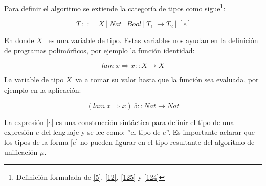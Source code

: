     \begin{definition}
        Para definir el algoritmo se extiende la categoría de tipos como sigue\footnote{Definición formulada de \hyperlink{5}{[5]},  \hyperlink{12}{[12]}, \hyperlink{125}{[125]} y \hyperlink{124}{[124]}}:
        
        $$\ T\ ::=\ X\ |\ Nat\ |\ Bool\ |\ T_1\ \to T_2\ |\ [e]$$
        
        En donde $X$ $\,$ es una variable de tipo. Estas variables nos ayudan en la definición de programas polimórficos, por ejemplo la función identidad:
        
        $$lam\ x\Rightarrow x :: X \to X$$ 
        
        La variable de tipo $X$$\,$ va a tomar su valor hasta que la función sea evaluada, por ejemplo en la aplicación:
       
        $$(lam \ x \Rightarrow x)\ 5 :: Nat \to Nat$$

        La expresión [$e$] es una construcción sintáctica para definir el tipo de una expresión $e$ del lenguaje y se lee como: ''el tipo de $e$''. Es importante aclarar que los tipos de la forma [$e$] no pueden figurar en el tipo resultante del algoritmo de unificación $\mu$.  
            
    \end{definition}

   \bigskip    


